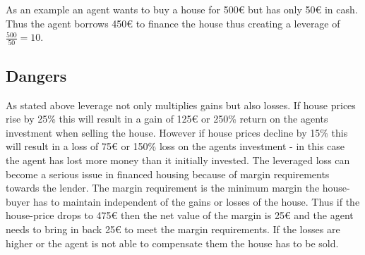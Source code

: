 \documentclass[../Bachelorarbeit.tex]{subfiles}
\begin{document}
As an example an agent wants to buy a house for 500\euro{} but has only 50\euro{} in cash. Thus the agent borrows 450\euro{} to finance the house thus creating a leverage of $\frac{500}{50} = 10$.

\subsection{Dangers}
As stated above leverage not only multiplies gains but also losses. If house prices rise by 25\% this will result in a gain of 125\euro{} or 250\% return on the agents investment when selling the house. However if house prices decline by 15\% this will result in a loss of 75\euro{} or 150\% loss on the agents investment - in this case the agent has lost more money than it initially invested. The leveraged loss can become a serious issue in financed housing because of margin requirements towards the lender. The margin requirement is the minimum margin the house-buyer has to maintain independent of the gains or losses of the house. Thus if the house-price drops to 475\euro{} then the net value of the margin is 25\euro{} and the agent needs to bring in back 25\euro{} to meet the margin requirements. If the losses are higher or the agent is not able to compensate them the house has to be sold. 


\end{document}
